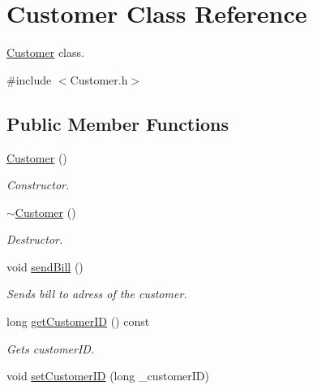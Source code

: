 \hypertarget{classCustomer}{}\section{Customer Class Reference}
\label{classCustomer}


\hyperlink{classCustomer}{Customer} class.  




{\ttfamily \#include $<$Customer.\+h$>$}

\subsection*{Public Member Functions}
\begin{DoxyCompactItemize}
\item 
\mbox{\label{classCustomer_abcc8fae9701e5ba9d7d6fe44498b34e3}} 
\hyperlink{classCustomer_abcc8fae9701e5ba9d7d6fe44498b34e3}{Customer} ()
\begin{DoxyCompactList}\small\item\em Constructor. \end{DoxyCompactList}\item 
\mbox{\label{classCustomer_ab93fb14683b0393b9c900109f77c2629}} 
\hyperlink{classCustomer_ab93fb14683b0393b9c900109f77c2629}{$\sim$\+Customer} ()
\begin{DoxyCompactList}\small\item\em Destructor. \end{DoxyCompactList}\item 
\mbox{\label{classCustomer_a927d85cfe1f6c23af8dd2a3c73561f49}} 
void \hyperlink{classCustomer_a927d85cfe1f6c23af8dd2a3c73561f49}{send\+Bill} ()
\begin{DoxyCompactList}\small\item\em Sends bill to adress of the customer. \end{DoxyCompactList}\item 
long \hyperlink{classCustomer_a5c5207f9678017b0fc42ed1f847d288f}{get\+Customer\+ID} () const
\begin{DoxyCompactList}\small\item\em Gets customer\+ID. \end{DoxyCompactList}\item 
void \hyperlink{classCustomer_acc7237a0121638d38846465ee9c2d26a}{set\+Customer\+ID} (long \+\_\+customer\+ID)

\end{DoxyCompactItemize}
